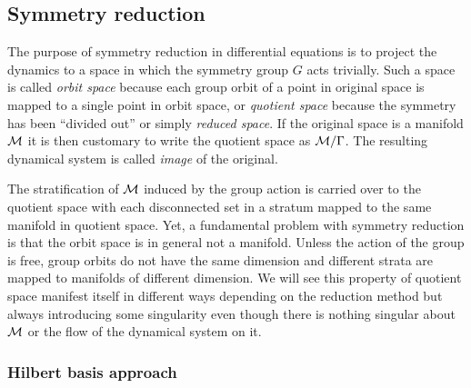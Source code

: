     \PublicPrivate{
    }{ %

\subsection{Equivariant bifurcation theory}

    } %



\subsection{Symmetry reduction}

The purpose of symmetry reduction in differential equations is to project the dynamics to a space
in which the symmetry group $G$ acts trivially. Such a space is called \emph{orbit space} because each
group orbit of a point in original space is mapped to a single point in orbit space, or \emph{quotient
space} because the symmetry has been ``divided out'' or simply \emph{reduced space}. If the original
space is a manifold $\mathcal{M}$ it is then customary to write the quotient space as $\mathcal{M}/\Gamma$.
The resulting dynamical system is called \emph{image} of the original.

The stratification of $\mathcal{M}$ induced by the group action is carried over to the quotient space with each disconnected set in a stratum mapped to the same manifold in quotient space.
Yet, a fundamental problem with symmetry reduction is that the orbit space is in general not a manifold.
Unless the action of the group is free, group orbits do not have the same dimension and different
strata are mapped to manifolds of different dimension. We will see this property of quotient space
manifest itself in different ways depending on the reduction method but always introducing some
singularity even though there is nothing singular about $\mathcal{M}$ or the flow of the dynamical system
on it.


\subsubsection{Hilbert basis approach}


